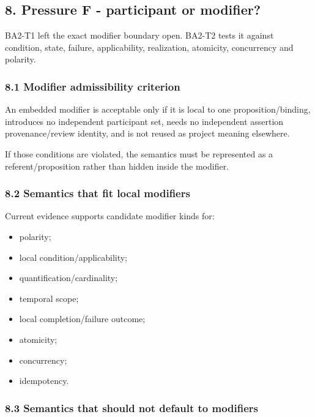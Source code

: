 \documentclass[
  10pt,
  letterpaper,
]{article}
\providecommand{\tightlist}{%
  \setlength{\itemsep}{0pt}\setlength{\parskip}{0pt}}
\begin{document}
\subsection{8. Pressure F - participant or
modifier?}\label{pressure-f---participant-or-modifier}

BA2-T1 left the exact modifier boundary open. BA2-T2 tests it against
condition, state, failure, applicability, realization, atomicity,
concurrency and polarity.

\subsubsection{8.1 Modifier admissibility
criterion}\label{modifier-admissibility-criterion}

An embedded modifier is acceptable only if it is local to one
proposition/binding, introduces no independent participant set, needs no
independent assertion provenance/review identity, and is not reused as
project meaning elsewhere.

If those conditions are violated, the semantics must be represented as a
referent/proposition rather than hidden inside the modifier.

\subsubsection{8.2 Semantics that fit local
modifiers}\label{semantics-that-fit-local-modifiers}

Current evidence supports candidate modifier kinds for:

\begin{itemize}
\tightlist
\item
  polarity;
\item
  local condition/applicability;
\item
  quantification/cardinality;
\item
  temporal scope;
\item
  local completion/failure outcome;
\item
  atomicity;
\item
  concurrency;
\item
  idempotency.
\end{itemize}

\subsubsection{8.3 Semantics that should not default to
modifiers}\label{semantics-that-should-not-default-to-modifiers}
\end{document}

